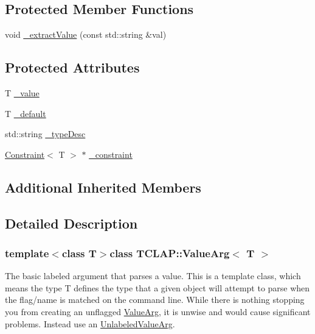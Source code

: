 \subsection*{Protected Member Functions}
\begin{DoxyCompactItemize}
\item 
void \hyperlink{class_t_c_l_a_p_1_1_value_arg_af0ecdb6537febfcaa322e7131d2b3bf8}{\+\_\+extract\+Value} (const std\+::string \&val)
\end{DoxyCompactItemize}
\subsection*{Protected Attributes}
\begin{DoxyCompactItemize}
\item 
T \hyperlink{class_t_c_l_a_p_1_1_value_arg_a45d5fdfce5865c02e6663f7438d485c7}{\+\_\+value}
\item 
T \hyperlink{class_t_c_l_a_p_1_1_value_arg_a118e3a7932700a8e3626d8f9ee2e0c95}{\+\_\+default}
\item 
std\+::string \hyperlink{class_t_c_l_a_p_1_1_value_arg_a78c5e5b67ce4bcebb57c886d9aa49259}{\+\_\+type\+Desc}
\item 
\hyperlink{class_t_c_l_a_p_1_1_constraint}{Constraint}$<$ T $>$ $\ast$ \hyperlink{class_t_c_l_a_p_1_1_value_arg_aa383908cff37688cf7493d46c840d03b}{\+\_\+constraint}
\end{DoxyCompactItemize}
\subsection*{Additional Inherited Members}


\subsection{Detailed Description}
\subsubsection*{template$<$class T$>$class T\+C\+L\+A\+P\+::\+Value\+Arg$<$ T $>$}

The basic labeled argument that parses a value. This is a template class, which means the type T defines the type that a given object will attempt to parse when the flag/name is matched on the command line. While there is nothing stopping you from creating an unflagged \hyperlink{class_t_c_l_a_p_1_1_value_arg}{Value\+Arg}, it is unwise and would cause significant problems. Instead use an \hyperlink{class_t_c_l_a_p_1_1_unlabeled_value_arg}{Unlabeled\+Value\+Arg}. 

